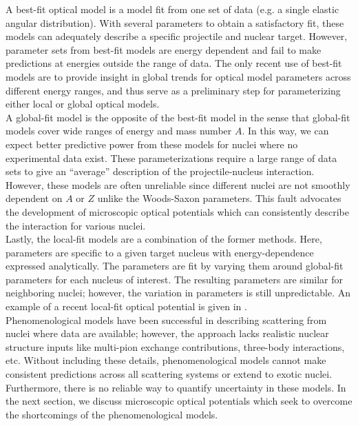 \documentclass[preprintnumbers,floatfix,aps,prc,preprint,nofootinbib]{revtex4-1}
\begin{document}
A best-fit optical model is a model fit from one set of data (e.g. a single elastic angular distribution). With several parameters to obtain a satisfactory fit, these models can adequately describe a specific projectile and nuclear target. However, parameter sets from best-fit models are energy dependent and fail to make predictions at energies outside the range of data. The only recent use of best-fit models are to provide insight in global trends for optical model parameters across different energy ranges, and thus serve as a preliminary step for parameterizing either local or global optical models.
\\

A global-fit model is the opposite of the best-fit model in the sense that global-fit models cover wide ranges of energy and mass number $A$. In this way, we can expect better predictive power from these models for nuclei where no experimental data exist. These parameterizations require a large range of data sets to give an ``average'' description of the projectile-nucleus interaction. However, these models are often unreliable since different nuclei are not smoothly dependent on $A$ or $Z$ unlike the Woods-Saxon parameters. This fault advocates the development of microscopic optical potentials which can consistently describe the interaction for various nuclei.
\\

Lastly, the local-fit models are a combination of the former methods. Here, parameters are specific to a given target nucleus with energy-dependence expressed analytically. The parameters are fit by varying them around global-fit parameters for each nucleus of interest. The resulting parameters are similar for neighboring nuclei; however, the variation in parameters is still unpredictable. An example of a recent local-fit optical potential is given in \cite{Koning:2003zz}.
\\

Phenomenological models have been successful in describing scattering from nuclei where data are available; however, the approach lacks realistic nuclear structure inputs like multi-pion exchange contributions, three-body interactions, etc. Without including these details, phenomenological models cannot make consistent predictions across all scattering systems or extend to exotic nuclei. Furthermore, there is no reliable way to quantify uncertainty in these models. In the next section, we discuss microscopic optical potentials which seek to overcome the shortcomings of the phenomenological models.
\end{document}
